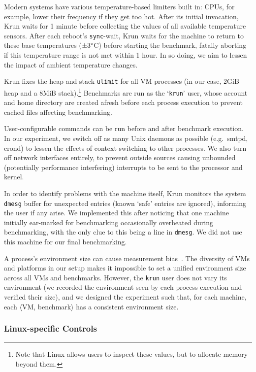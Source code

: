 \documentclass[acmsmall]{acmart}\settopmatter{printfolios=true}
\newcommand{\krun}{Krun\xspace}
\newcommand{\vmbpair}{$\langle$VM, benchmark$\rangle$\xspace}
\begin{document}
Modern systems have various temperature-based limiters built in:
CPUs, for example, lower their frequency if they get too hot.
After its initial invocation, \krun waits for 1 minute before collecting
the values of all available temperature sensors. After each reboot's \texttt{sync}-wait, \krun waits
for the machine to return to these base temperatures ($\pm3\degree$C) before
starting the benchmark, fatally aborting if this temperature range is not
met within 1 hour. In so doing, we aim to lessen the impact of ambient temperature changes.

\krun fixes the heap and stack \texttt{ulimit} for all VM processes
(in our case, 2GiB heap and a 8MiB stack).\footnote{Note that Linux allows users
to inspect these values, but to allocate memory beyond them.} Benchmarks are run
as the `\texttt{krun}' user, whose account and home directory are created
afresh before each process execution to prevent cached files affecting benchmarking.

User-configurable commands can be run before and after benchmark execution. In
our experiment, we switch off as many Unix daemons as possible (e.g.~smtpd,
crond) to lessen the effects of context switching to other processes. We also
turn off network interfaces entirely, to prevent outside sources causing unbounded
(potentially performance interfering) interrupts to be sent to the processor and kernel.

In order to identify problems with the machine itself, \krun monitors the
system \texttt{dmesg} buffer for unexpected entries (known `safe' entries
are ignored), informing the user if any arise. We implemented this after
noticing that one machine initially ear-marked for benchmarking occasionally
overheated during benchmarking, with the only clue to this being a line in \texttt{dmesg}.
We did not use this machine for our final benchmarking.

A process's environment size can cause measurement
bias~\cite{mytkowicz09surprising}. The diversity of VMs and platforms
in our setup makes it impossible to set a unified environment size across all VMs and
benchmarks. However, the \texttt{krun} user does not
vary its environment (we recorded the environment seen by each process
execution and verified their size), and we designed the experiment such that,
for each machine, each \vmbpair has a consistent environment size.


\subsubsection{Linux-specific Controls}
\end{document}
